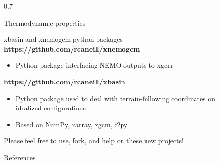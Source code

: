 \documentclass[final]{beamer}
\newlength{\sepwidth}
\newlength{\colwidth}
\newcommand{\separatorcolumn}{\begin{column}{\sepwidth}\end{column}}
\begin{document}
\begin{frame}[t]
\begin{columns}[t]
\begin{column}{0.7\colwidth}
\begin{exampleblock}{Thermodynamic properties}
  \end{exampleblock}

  
  \begin{exampleblock}{xbasin and xnemogcm python packages}
    \textbf{https://github.com/rcaneill/xnemogcm}
    \begin{itemize}
    \item Python package interfacing NEMO outputs to xgcm
    \end{itemize}
    
    \textbf{https://github.com/rcaneill/xbasin}
    \begin{itemize}
    \item Python package used to deal with terrain-following coordinates
      on idealized configurations
    \item Based on NumPy, xarray, xgcm, f2py
    \end{itemize}

    Please feel free to use, fork, and help on these new projects!
  \end{exampleblock}

  
  \begin{block}{References}

    
    \footnotesize{
      
      }

  \end{block}

\end{column}

\separatorcolumn
\end{columns}
\end{frame}
\end{document}
